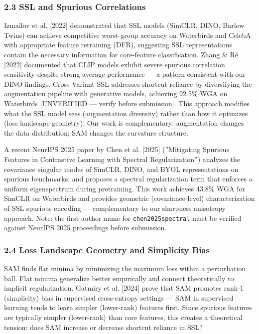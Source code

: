\subsubsection{2.3 SSL and Spurious Correlations}

Izmailov et al. [2022] demonstrated that SSL models (SimCLR, DINO, Barlow Twins) can achieve competitive worst-group accuracy on Waterbirds and CelebA with appropriate feature retraining (DFR), suggesting SSL representations contain the necessary information for core-feature classification. Zhang \& Ré [2022] documented that CLIP models exhibit severe spurious correlation sensitivity despite strong average performance --- a pattern consistent with our DINO findings. Cross-Variant SSL \citep{yadav2026crossvariant} addresses shortcut reliance by diversifying the augmentation pipeline with generative models, achieving 92.5\% WGA on Waterbirds [UNVERIFIED --- verify before submission]. This approach modifies what the SSL model sees (augmentation diversity) rather than how it optimizes (loss landscape geometry). Our work is complementary: augmentation changes the data distribution; SAM changes the curvature structure.

A recent NeurIPS 2025 paper by Chen et al. [2025] (''Mitigating Spurious Features in Contrastive Learning with Spectral Regularization'') analyzes the covariance singular modes of SimCLR, DINO, and BYOL representations on spurious benchmarks, and proposes a spectral regularization term that enforces a uniform eigenspectrum during pretraining. This work achieves 43.8\% WGA for SimCLR on Waterbirds and provides geometric (covariance-level) characterization of SSL spurious encoding --- complementary to our sharpness anisotropy approach. Note: the first author name for \texttt{chen2025spectral} must be verified against NeurIPS 2025 proceedings before submission.

\subsubsection{2.4 Loss Landscape Geometry and Simplicity Bias}

SAM \citep{foret2021sam} finds flat minima by minimizing the maximum loss within a perturbation ball. Flat minima generalize better empirically and connect theoretically to implicit regularization. Gatmiry et al. [2024] prove that SAM promotes rank-1 (simplicity) bias in supervised cross-entropy settings --- SAM in supervised learning tends to learn simpler (lower-rank) features first. Since spurious features are typically simpler (lower-rank) than core features, this creates a theoretical tension: does SAM increase or decrease shortcut reliance in SSL?

